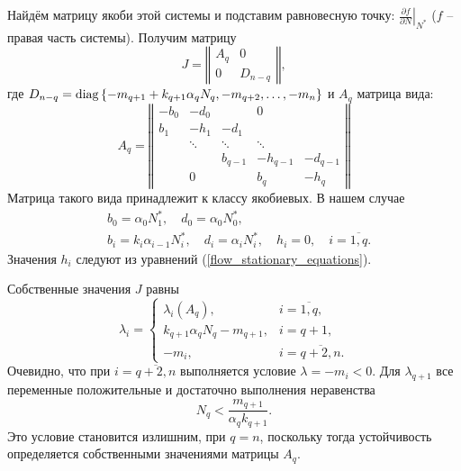     Найдём матрицу якоби этой системы и подставим равновесную точку: \( \left.\frac{\partial f}{\partial N}\right|_{N^*} \) (\(f\) -- правая часть системы). Получим матрицу
    \begin{equation} \label{flow_jacobian_small}
        J = \left\Vert \begin{matrix}
            A_q & 0 \\
            0 & D_{n-q}
        \end{matrix} \right\Vert,
    \end{equation}
    где \(D_{n-q} = \operatorname{diag}\left\{ -m_{q+1} + k_{q+1} \alpha_q N_q, -m_{q+2}, \ldots, -m_{n} \right\}\) и \(A_q\) матрица вида:
    \begin{equation} \label{flow_jacobian_big}
        A_q = \left\Vert \begin{matrix}
                -b_0  & -d_0   &          &     0    & \\
                b_1  & -h_1   &  -d_1    &          & \\
                        & \ddots & \ddots   &  \ddots  &          \\
                        &        & b_{q-1}  & -h_{q-1} & -d_{q-1} \\
                        &   0    &          & b_{q}    & -h_{q}  
        \end{matrix} \right\Vert
    \end{equation}
    Матрица такого вида принадлежит к классу якобиевых. В нашем случае 
    \begin{equation} \label{flow_jacobian_vars}
        \begin{split}
            & b_0 = \alpha_0 N^*_1, \quad d_0 = \alpha_0 N^*_0, \\
            & b_i = k_i \alpha_{i-1} N^*_i, \quad d_i = \alpha_i N^*_i, \quad h_i = 0, \quad i=\overline{1,q}.
        \end{split}
    \end{equation}
    Значения \(h_i\) следуют из уравнений (\ref{flow_stationary_equations}).


    Собственные значения \(J\) равны
    \begin{equation} \label{flow_jacobian_spectrum}
        \lambda_i = \left\{ \begin{matrix}
            \lambda_i (A_q), & i=\overline{1,q}, \\
            k_{q+1} \alpha_q N_q - m_{q+1}, & i=q+1, \\
            -m_i, & i=\overline{q+2, n}. 
        \end{matrix} \right.
    \end{equation}
    Очевидно, что при \(i = \overline{q+2,n}\) выполняется условие \(\lambda = -m_i < 0\). Для \(\lambda_{q+1}\) все переменные положительные и достаточно выполнения неравенства
    \begin{equation} \label{flow_nq_upper}
        N_q < \frac{m_{q+1}}{\alpha_q k_{q+1}}.
    \end{equation}
    Это условие становится излишним, при \(q = n\), поскольку тогда устойчивость определяется собственными значениями матрицы \(A_q\).

